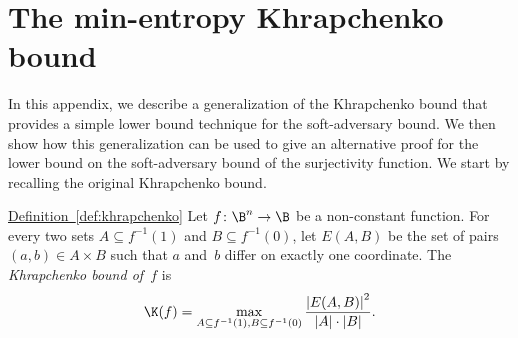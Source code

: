 \documentclass[11pt]{article}
\numberwithin{equation}{section}
\theoremstyle{definition}
\theoremstyle{plain}
\newcommand{\expref}[2]{\hyperref[#2]{#1~\ref{#2}}}
\theoremstyle{definition}\newtheorem{notation}[theorem]{Notation}\theoremstyle{plain}
\begin{document}
\section{\label{sec:min-khrapchenko}The min-entropy Khrapchenko bound}

In this appendix, we describe a generalization of the Khrapchenko
bound that provides a simple %
lower bound technique for %
the soft-adversary
bound. We then show how this generalization can be used to give an
alternative proof for the lower bound on the soft-adversary bound
of the surjectivity function. We start by recalling the original Khrapchenko
bound.
\begin{repdefinition}{\expref{Definition}{def:khrapchenko}}
Let $f\colon\B^{n}\to\B$ be a non-constant function. For every two
sets $A\subseteq f^{-1}(1)$ and $B\subseteq f^{-1}(0)$, let $E(A,B)$
be the set of pairs $(a,b)\in A\times B$ such that $a$ and~$b$
differ on exactly one coordinate. The \emph{Khrapchenko bound of~$f$}
is 
\[
\K(f)=\max_{A\subseteq f^{-1}(1),B\subseteq f^{-1}(0)}\frac{\left|E(A,B)\right|^{2}}{\left|A\right|\cdot\left|B\right|}.
\]
\end{repdefinition}
\end{document}
